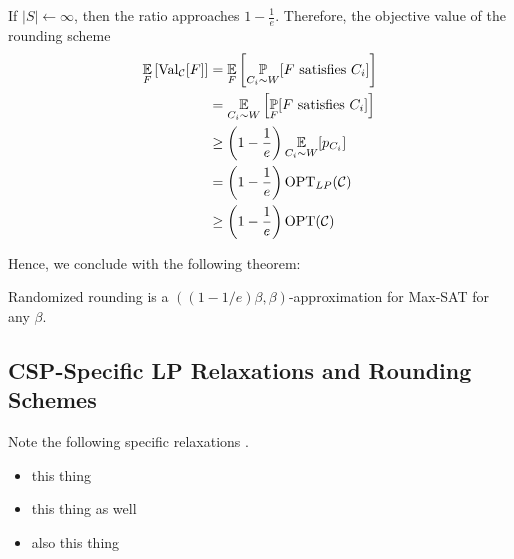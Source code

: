 If $|S| \leftarrow \infty$, then the ratio approaches $1 - \frac{1}{e}$. 
Therefore, the objective value of the rounding scheme
\begin{align*}
	\underset{F}{\mathbb{E}} \left[ \text{Val}_{\mathcal{C}}[F]\right] &= \underset{F}{\mathbb{E}}\left[ \underset{C_i \sim W}{\mathbb{P}}[ F \text{ satisfies } C_i] \right]\\
	&=  \underset{C_i \sim W}{\mathbb{E}}\left[ \underset{F}{\mathbb{P}}[ F \text{ satisfies } C_i] \right]\\
	&\ge \left( 1 - \frac{1}{e} \right) \underset{C_i \sim W}{\mathbb{E}} [ p_{C_i} ]\\
	&= \left( 1 - \frac{1}{e} \right) \text{OPT}_{LP}(\mathcal{C})\\
	&\ge \left( 1 - \frac{1}{e} \right) \text{OPT}(\mathcal{C})\\
\end{align*}

Hence, we conclude with the following theorem:
\begin{thm}
	Randomized rounding is a $\left( ( 1 - 1/e)\beta, \beta \right)$-approximation for Max-SAT for any $\beta$.
\end{thm}
\subsection{CSP-Specific LP Relaxations and Rounding Schemes}
Note the following specific relaxations \cite{GoeWil94,Asa97,Yan94}.
\begin{itemize}
\item this thing
\item this thing as well
\item also this thing
\end{itemize}

